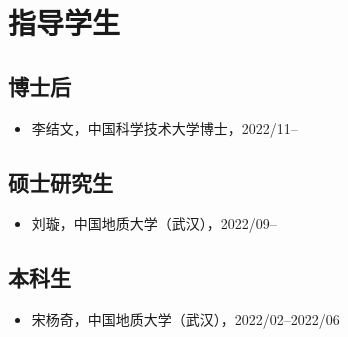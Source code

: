 \section{指导学生}

\subsection{博士后}
\begin{itemize}
\item 李结文，中国科学技术大学博士，2022/11--
\end{itemize}

\subsection{硕士研究生}
\begin{itemize}
\item 刘璇，中国地质大学（武汉），2022/09--
\end{itemize}

\subsection{本科生}
\begin{itemize}
\item 宋杨奇，中国地质大学（武汉），2022/02--2022/06
\end{itemize}
